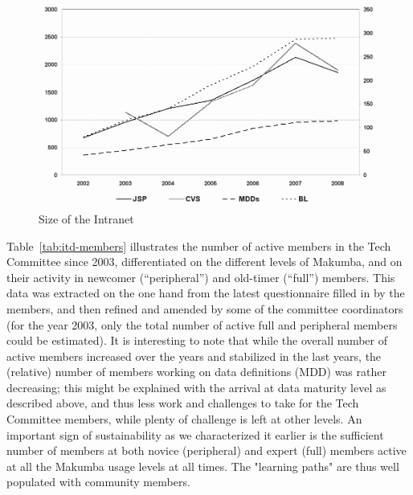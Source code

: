 \documentclass{sig-alt-release2}
\begin{document}
\begin{figure}\label{fig:intranet-size}
  \includegraphics[width=0.98\columnwidth]{figures/SizeChart}
  \caption{Size of the Intranet}
\end{figure} 

Table~\ref{tab:itd-members} illustrates the number of active members in the Tech Committee since 2003, differentiated on the different levels of Makumba, and on their activity in newcomer (``peripheral'') and old-timer (``full'') members. This data was  extracted on the one hand from the latest questionnaire filled in by the members, and then refined and amended by some of the committee coordinators (for the year 2003, only the total number of active full and peripheral members could be estimated). It is interesting to note that while the overall number of active members increased over the years and stabilized in the last years, the (relative) number of members working on data definitions (MDD) was rather decreasing; this might be explained with the arrival at data maturity level as described above, and thus less work and challenges to take for the Tech Committee members, while plenty of challenge is left at other levels. An important sign of sustainability as we characterized it earlier is the sufficient number of members at both novice (peripheral) and expert (full) members active at all the Makumba usage levels at all times. The "learning paths" are thus well populated with community members.
\end{document}
